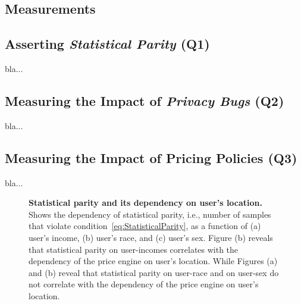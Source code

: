 \subsection{Measurements}

\subsection*{\normalsize Asserting {\em Statistical Parity} (Q1)}
bla...

\subsection*{\normalsize Measuring the Impact of {\em Privacy Bugs} (Q2)}
bla...

\subsection*{\normalsize Measuring the Impact of Pricing Policies (Q3)}
bla...

\begin{figure*}[t]
{
 \caption{\textbf{Statistical parity and its dependency on user's location.}
          Shows the dependency of statistical parity, i.e., number of samples that
          violate condition~\ref{eq:StatisticalParity}, as a function of (a) user's income,
          (b) user's race, and (c) user's sex. Figure (b) reveals that statistical parity on
          user-incomes correlates with the dependency of the price engine on user's location.
          While Figures (a) and (b) reveal that statistical parity on user-race and on user-sex
          do not correlate with the dependency of the price engine on user's location.}
}
\end{figure*}


